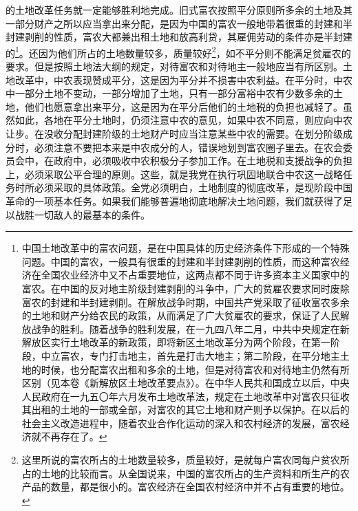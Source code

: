 \documentclass[cn,11pt,chinese]{elegantbook}
\begin{document}
的土地改革任务就一定能够胜利地完成。旧式富农按照平分原则所多余的土地及其一部分财产之所以应当拿出来分配，是因为中国的富农一般地带着很重的封建和半封建剥削的性质，富农大都兼出租土地和放高利贷，其雇佣劳动的条件亦是半封建的\footnote[9]{ 中国土地改革中的富农问题，是在中国具体的历史经济条件下形成的一个特殊问题。中国的富农，一般具有很重的封建和半封建剥削的性质，而这种富农经济在全国农业经济中又不占重要地位，这两点都不同于许多资本主义国家中的富农。在中国的反对地主阶级封建剥削的斗争中，广大的贫雇农要求同时废除富农的封建和半封建剥削。在解放战争时期，中国共产党采取了征收富农多余的土地和财产分给农民的政策，从而满足了广大贫雇农的要求，保证了人民解放战争的胜利。随着战争的胜利发展，在一九四八年二月，中共中央规定在新解放区实行土地改革的新政策，即将新区土地改革分为两个阶段，在第一阶段，中立富农，专门打击地主，首先是打击大地主；第二阶段，在平分地主土地的时候，也分配富农出租和多余的土地，但是对待富农和对待地主仍然有所区别（见本卷《新解放区土地改革要点》）。在中华人民共和国成立以后，中央人民政府在一九五〇年六月发布土地改革法，规定在土地改革中对富农只征收其出租的土地的一部或全部，对富农的其它土地和财产则予以保护。在以后的社会主义改造进程中，随着农业合作化运动的深入和农村经济的发展，富农经济就不再存在了。}。还因为他们所占的土地数量较多，质量较好\footnote[10]{ 这里所说的富农所占的土地数量较多，质量较好，是就每户富农同每户贫农所占的土地的比较而言。从全国说来，中国的富农所占的生产资料和所生产的农产品的数量，都是很小的。富农经济在全国农村经济中并不占有重要的地位。}，如不平分则不能满足贫雇农的要求。但是按照土地法大纲的规定，对待富农和对待地主一般地应当有所区别。土地改革中，中农表现赞成平分，这是因为平分并不损害中农利益。在平分时，中农中一部分土地不变动，一部分增加了土地，只有一部分富裕中农有少数多余的土地，他们也愿意拿出来平分，这是因为在平分后他们的土地税的负担也减轻了。虽然如此，各地在平分土地时，仍须注意中农的意见，如果中农不同意，则应向中农让步。在没收分配封建阶级的土地财产时应当注意某些中农的需要。在划分阶级成分时，必须注意不要把本来是中农成分的人，错误地划到富农圈子里去。在农会委员会中，在政府中，必须吸收中农积极分子参加工作。在土地税和支援战争的负担上，必须采取公平合理的原则。这些，就是我党在执行巩固地联合中农这一战略任务时所必须采取的具体政策。全党必须明白，土地制度的彻底改革，是现阶段中国革命的一项基本任务。如果我们能够普遍地彻底地解决土地问题，我们就获得了足以战胜一切敌人的最基本的条件。\\
\end{document}
